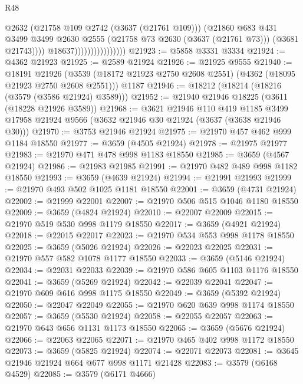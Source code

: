 \begin{lexlean}{R48}
\begin{coremodule}
                                        @2632
                                        (@21758 @109 @2742 (@3637 (@21761 @109)))
                                        (@21860
                                          @683
                                          @431
                                          @3499
                                          @3499
                                          @2630
                                          @2555
                                          (@21758 @73 @2630 (@3637 (@21761 @73)))
                                          (@3681 @21743))))
                                    @18637))))))))))))))))
@21923 := @5858 @3331 @3334
@21924 := @4362 @21923
@21925 := @2589 @21924
@21926 := @21925 @9555
@21940 := @18191
    @21926
    (@3539 (@18172 @21923 @2750 @2608 @2551) (@4362 (@18095 @21923 @2750 @2608 @2551)))
    @1187
@21946 := @18212 (@18214 (@18216 (@3579 (@3586 @21924) @3589)))
@21952 := @21940 @21946 @18225 (@3611 (@18228 @21926 @3589))
@21968 := @3621
    @21946
    @110
    @419
    @1185
    @3499
    @17958
    @21924
    @9566
    (@3632 @21946 @30 @21924 (@3637 (@3638 @21946 @30)))
@21970 := @3753 @21946 @21924
@21975 := @21970 @457 @462 @999 @1184 @18550
@21977 := @3659 (@4505 @21924)
@21978 := @21975 @21977
@21983 := @21970 @471 @478 @998 @1183 @18550
@21985 := @3659 (@4567 @21924)
@21986 := @21983 @21985
@21991 := @21970 @482 @489 @998 @1182 @18550
@21993 := @3659 (@4639 @21924)
@21994 := @21991 @21993
@21999 := @21970 @493 @502 @1025 @1181 @18550
@22001 := @3659 (@4731 @21924)
@22002 := @21999 @22001
@22007 := @21970 @506 @515 @1046 @1180 @18550
@22009 := @3659 (@4824 @21924)
@22010 := @22007 @22009
@22015 := @21970 @519 @530 @998 @1179 @18550
@22017 := @3659 (@4921 @21924)
@22018 := @22015 @22017
@22023 := @21970 @534 @553 @998 @1178 @18550
@22025 := @3659 (@5026 @21924)
@22026 := @22023 @22025
@22031 := @21970 @557 @582 @1078 @1177 @18550
@22033 := @3659 (@5146 @21924)
@22034 := @22031 @22033
@22039 := @21970 @586 @605 @1103 @1176 @18550
@22041 := @3659 (@5269 @21924)
@22042 := @22039 @22041
@22047 := @21970 @609 @616 @998 @1175 @18550
@22049 := @3659 (@5392 @21924)
@22050 := @22047 @22049
@22055 := @21970 @620 @639 @998 @1174 @18550
@22057 := @3659 (@5530 @21924)
@22058 := @22055 @22057
@22063 := @21970 @643 @656 @1131 @1173 @18550
@22065 := @3659 (@5676 @21924)
@22066 := @22063 @22065
@22071 := @21970 @465 @402 @998 @1172 @18550
@22073 := @3659 (@5825 @21924)
@22074 := @22071 @22073
@22081 := @3645 @21946 @21924 @664 @677 @998 @1171 @21428
@22083 := @3579 (@6168 @4529)
@22085 := @3579 (@6171 @4666)

\end{coremodule}
\end{lexlean}
